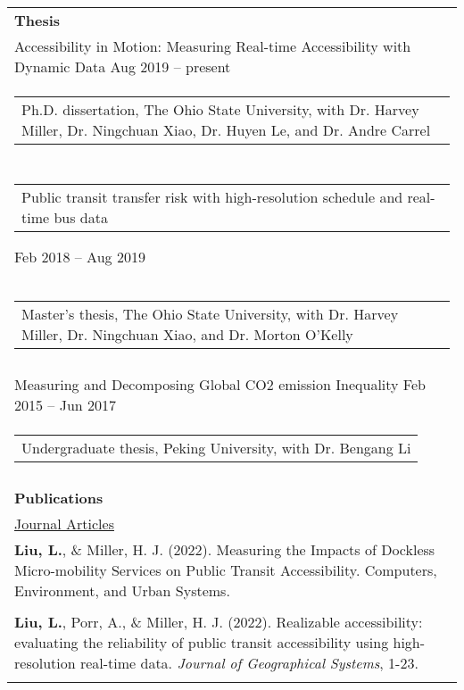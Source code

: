 \documentclass[letterpaper, 11pt]{article}
\begin{document}
\begin{longtable}{p{6.5in}}

{\textbf{Thesis}}\\

Accessibility in Motion: Measuring Real-time Accessibility with Dynamic Data \hfill Aug 2019 -- present \\ 
\begin{tabular}{p{5in}}
Ph.D. dissertation, The Ohio State University, with Dr. Harvey Miller, Dr. Ningchuan Xiao, Dr. Huyen Le, and Dr. Andre Carrel
\end{tabular} \\ \\

\begin{tabular}{p{5in}}
Public transit transfer risk with high-resolution schedule and real-time bus data 
\end{tabular} \hfill Feb 2018 -- Aug 2019 \\
\begin{tabular}{p{5in}}
Master's thesis, The Ohio State University, with Dr. Harvey Miller, Dr. Ningchuan Xiao, and Dr. Morton O'Kelly
\end{tabular} \\ \\


Measuring and Decomposing Global CO2 emission Inequality \hfill Feb 2015 -- Jun 2017 \\ 
\begin{tabular}{p{5in}}
Undergraduate thesis, Peking University, with Dr. Bengang Li
\end{tabular} \\ \\

\nohyphens{\textbf{Publications}} \\
\underline{Journal Articles} \\
\textbf{Liu, L.}, \& Miller, H. J. (2022). Measuring the Impacts of Dockless Micro-mobility Services on Public Transit Accessibility. Computers, Environment, and Urban Systems.\\\\

\textbf{Liu, L.}, Porr, A., \& Miller, H. J. (2022). Realizable accessibility: evaluating the reliability of public transit accessibility using high-resolution real-time data. \textit{Journal of Geographical Systems}, 1-23.\\\\


\end{longtable}
\end{document}
